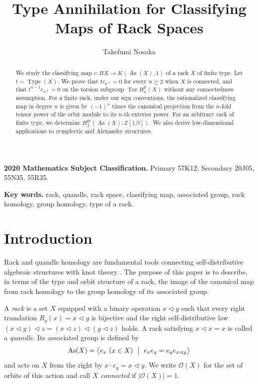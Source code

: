 \documentclass[11pt]{article}
\title{Type Annihilation for Classifying Maps of Rack Spaces}
\author{Takefumi Nosaka}
\date{}
\DeclareMathOperator{\As}{As}
\DeclareMathOperator{\Tor}{Tor}
\DeclareMathOperator{\Type}{Type}
\newcommand{\OO}{\mathcal O}
\begin{document}
\maketitle

\begin{abstract}
We study the classifying map $c\colon BX\to K(\As(X),1)$ of a rack $X$ of finite type. Let $t = \Type(X)$. We prove that $t c_{n*}=0$ for every $n\ge2$ when $X$ is connected, and that $t^{n-1}c_{n*}=0$ on the torsion subgroup $\Tor H_n^\mathbb{R}(X)$ without any connectedness assumption. For a finite rack, under our sign conventions, the rationalized classifying map in degree $n$ is given by $(-1)^n$ times the canonical projection from the $n$-fold tensor power of the orbit module to its $n$-th exterior power. For an arbitrary rack of finite type, we determine $H_2^{\mathrm{gr}}(\As(X);\mathbb{Z}[1/t])$. We also derive low-dimensional applications to symplectic and Alexander structures.
\end{abstract}
\medskip
\noindent\textbf{2020 Mathematics Subject Classification.}
Primary 57K12; Secondary 20J05, 55N35, 55R35.


\smallskip
\noindent\textbf{Key words.}
rack, quandle, rack space, classifying map, associated group, rack homology,
group homology, type of a rack.

\section{Introduction}

Rack and quandle homology are fundamental tools connecting self-distributive algebraic structures with knot theory \cite{CJKS,FRS}. The purpose of this paper is to describe, in terms of the type and orbit structure of a rack, the image of the canonical map from rack homology to the group homology of its associated group.

A \emph{rack} is a set $X$ equipped with a binary operation $x\lhd y$ such that every right translation $R_y(x)=x\lhd y$ is bijective and the right self-distributive law
$(x\lhd y)\lhd z=(x\lhd z)\lhd(y\lhd z)$ holds. A rack satisfying $x\lhd x=x$ is called a \emph{quandle}. Its associated group is defined by
\begin{equation}
 \As(X)=\bigl\langle e_x\ (x\in X)\ \bigm|\
 e_xe_y=e_y e_{x\lhd y}\bigr\rangle
 \label{eq:associated-group-intro}
\end{equation}
and acts on $X$ from the right by $x\cdot e_y=x\lhd y$. We write $\OO(X)$ for the set of orbits of this action and call $X$ \emph{connected} if $|\OO(X)|=1$.
\end{document}
